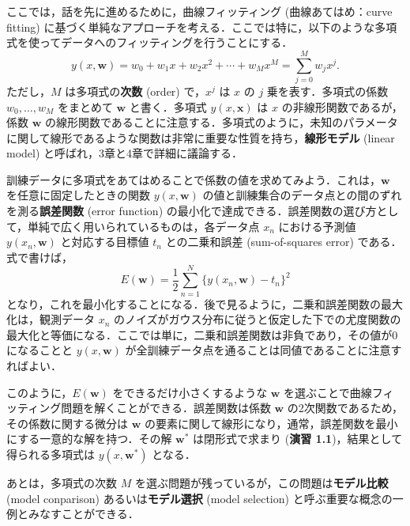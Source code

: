 \documentclass[uplatex,a4paper,oneside,openany,dvipdfmx]{jsarticle}
\numberwithin{equation}{section}
\theoremstyle{mystyle} %
\newcommand{\tb}[1]{\textbf{#1}}
\newcommand{\bs}[1]{\boldsymbol{#1}}
\begin{document}
ここでは，話を先に進めるために，曲線フィッティング (曲線あてはめ：curve fitting) に基づく単純なアプローチを考える．ここでは特に，以下のような多項式を使ってデータへのフィッティングを行うことにする．
\begin{equation} \label{eq:1.1}
    y(x,\bs{w}) = w_{0} + w_{1}x + w_{2}x^{2} + \cdots + w_{M}x^{M} = \sum_{j=0}^{M} w_{j}x^{j}.
\end{equation}
ただし，$M$ は多項式の\tb{次数} (order) で，$x^{j}$ は $x$ の $j$ 乗を表す．多項式の係数 $w_{0},\ldots,w_{M}$ をまとめて $\bs{w}$ と書く．多項式 $y(x,\bs{x})$ は $x$ の非線形関数であるが，係数 $\bs{w}$ の線形関数であることに注意する．多項式のように，未知のパラメータに関して線形であるような関数は非常に重要な性質を持ち，\tb{線形モデル} (linear model) と呼ばれ，3章と4章で詳細に議論する．

訓練データに多項式をあてはめることで係数の値を求めてみよう．これは，$\bs{w}$ を任意に固定したときの関数 $y(x,\bs{w})$ の値と訓練集合のデータ点との間のずれを測る\tb{誤差関数} (error function) の最小化で達成できる．誤差関数の選び方として，単純で広く用いられているものは，各データ点 $x_{n}$ における予測値 $y(x_{n},\bs{w})$ と対応する目標値 $t_{n}$ との二乗和誤差 (sum-of-squares error) である．式で書けば，
\begin{equation} \label{eq:1.2}
    E(\bs{w}) = \frac{1}{2} \sum_{n=1}^{N} \{y(x_{n},\bs{w}) - t_{n}\}^{2}
\end{equation}
となり，これを最小化することになる．後で見るように，二乗和誤差関数の最大化は，観測データ $x_{n}$ のノイズがガウス分布に従うと仮定した下での尤度関数の最大化と等価になる．ここでは単に，二乗和誤差関数は非負であり，その値が0になることと $y(x,\bs{w})$ が全訓練データ点を通ることは同値であることに注意すればよい．

このように，$E(\bs{w})$ をできるだけ小さくするような $\bs{w}$ を選ぶことで曲線フィッティング問題を解くことができる．誤差関数は係数 $\bs{w}$ の2次関数であるため，その係数に関する微分は $\bs{w}$ の要素に関して線形になり，通常，誤差関数を最小にする一意的な解を持つ．その解 $\bs{w}^{\ast}$ は閉形式で求まり (\tb{演習 1.1})，結果として得られる多項式は $y(x,\bs{w}^{\ast})$ となる．

あとは，多項式の次数 $M$ を選ぶ問題が残っているが，この問題は\tb{モデル比較} (model conparison) あるいは\tb{モデル選択} (model selection) と呼ぶ重要な概念の一例とみなすことができる．
\end{document}
